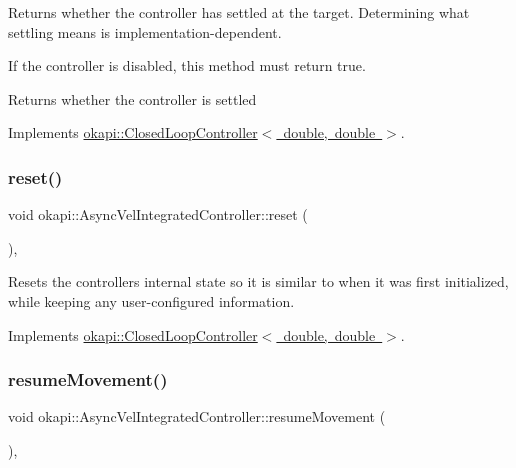 Returns whether the controller has settled at the target. Determining what settling means is implementation-\/dependent.

If the controller is disabled, this method must return true.

\begin{DoxyReturn}{Returns}
whether the controller is settled 
\end{DoxyReturn}


Implements \mbox{\hyperlink{classokapi_1_1ClosedLoopController_aed7aa0e94b6474c28314f8517d6cb4d8}{okapi\+::\+Closed\+Loop\+Controller$<$ double, double $>$}}.

\mbox{\label{classokapi_1_1AsyncVelIntegratedController_aef78a032062241ece030d58407179912}} 
\subsubsection{\texorpdfstring{reset()}{reset()}}
{\footnotesize\ttfamily void okapi\+::\+Async\+Vel\+Integrated\+Controller\+::reset (\begin{DoxyParamCaption}{ }\end{DoxyParamCaption})\hspace{0.3cm}{\ttfamily [override]}, {\ttfamily [virtual]}}

Resets the controller\textquotesingle{}s internal state so it is similar to when it was first initialized, while keeping any user-\/configured information. 

Implements \mbox{\hyperlink{classokapi_1_1ClosedLoopController_a7dd6ce28b3e38bdf987514a1b6c83c8c}{okapi\+::\+Closed\+Loop\+Controller$<$ double, double $>$}}.

\mbox{\label{classokapi_1_1AsyncVelIntegratedController_ae017d0031a2ba76d199039cbf7a1465f}} 
\subsubsection{\texorpdfstring{resumeMovement()}{resumeMovement()}}
{\footnotesize\ttfamily void okapi\+::\+Async\+Vel\+Integrated\+Controller\+::resume\+Movement (\begin{DoxyParamCaption}{ }\end{DoxyParamCaption})\hspace{0.3cm}{\ttfamily [protected]}, {\ttfamily [virtual]}}

